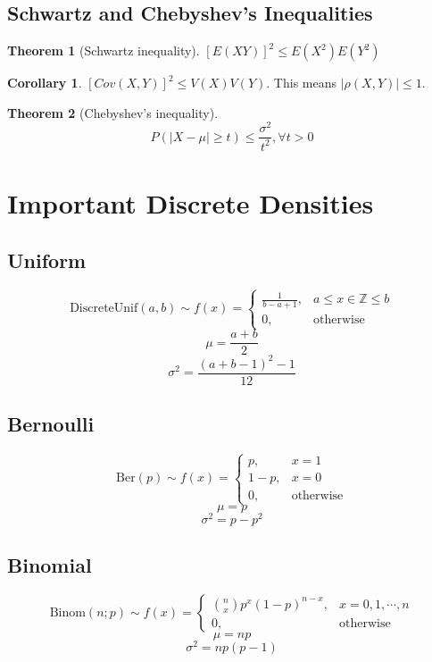 \documentclass[10pt, a4paper]{extarticle}
\theoremstyle{definition}
\newtheorem{thm}{Theorem}
\newtheorem{cor}{Corollary}[thm]
\begin{document}
\subsection{Schwartz and Chebyshev's Inequalities}
\begin{thm}[Schwartz inequality]
	$[E(XY)]^2\leq E(X^2)E(Y^2)$
\end{thm}
\begin{cor}
	$[Cov(X,Y)]^2\leq V(X)V(Y)$. This means $|\rho(X,Y)|\leq 1$.
\end{cor}

\begin{thm}[Chebyshev's inequality]
	\[P(|X-\mu|\geq t)\leq \frac{\sigma^2}{t^2}, \forall t>0\]
\end{thm}


\section{Important Discrete Densities}
\subsection{Uniform}
\[\text{DiscreteUnif}(a,b)\sim f(x)=\begin{cases}
		\frac{1}{b-a+1}, & a\leq x\in\mathbb{Z}\leq b \\
		0,               & \text{otherwise}
	\end{cases}\]
\[\mu = \frac{a+b}{2}\]
\[\sigma^2=\frac{(a+b-1)^2-1}{12}\]

\subsection{Bernoulli}
\[\text{Ber}(p)\sim f(x)=
	\begin{cases}
		p,   & x=1              \\
		1-p, & x=0              \\
		0,   & \text{otherwise}
	\end{cases}
\]
\[\mu=p\]
\[\sigma^2=p-p^2\]

\subsection{Binomial}
\[\text{Binom}(n;p)\sim f(x)=\begin{cases}
		\binom{n}{x}p^x(1-p)^{n-x}, & x=0,1,\cdots,n   \\
		0,                          & \text{otherwise}
	\end{cases}\]
\[\mu=np\]
\[\sigma^2=np(p-1)\]
\end{document}
